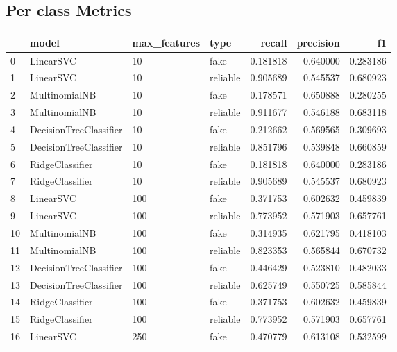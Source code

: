 \subsection{Per class Metrics}
\begin{longtable}{llllrrr}
\toprule
{} &                   model & max\_features &      type &    recall &  precision &        f1 \\
\midrule
0  &               LinearSVC &           10 &      fake &  0.181818 &   0.640000 &  0.283186 \\
1  &               LinearSVC &           10 &  reliable &  0.905689 &   0.545537 &  0.680923 \\
2  &           MultinomialNB &           10 &      fake &  0.178571 &   0.650888 &  0.280255 \\
3  &           MultinomialNB &           10 &  reliable &  0.911677 &   0.546188 &  0.683118 \\
4  &  DecisionTreeClassifier &           10 &      fake &  0.212662 &   0.569565 &  0.309693 \\
5  &  DecisionTreeClassifier &           10 &  reliable &  0.851796 &   0.539848 &  0.660859 \\
6  &         RidgeClassifier &           10 &      fake &  0.181818 &   0.640000 &  0.283186 \\
7  &         RidgeClassifier &           10 &  reliable &  0.905689 &   0.545537 &  0.680923 \\
8  &               LinearSVC &          100 &      fake &  0.371753 &   0.602632 &  0.459839 \\
9  &               LinearSVC &          100 &  reliable &  0.773952 &   0.571903 &  0.657761 \\
10 &           MultinomialNB &          100 &      fake &  0.314935 &   0.621795 &  0.418103 \\
11 &           MultinomialNB &          100 &  reliable &  0.823353 &   0.565844 &  0.670732 \\
12 &  DecisionTreeClassifier &          100 &      fake &  0.446429 &   0.523810 &  0.482033 \\
13 &  DecisionTreeClassifier &          100 &  reliable &  0.625749 &   0.550725 &  0.585844 \\
14 &         RidgeClassifier &          100 &      fake &  0.371753 &   0.602632 &  0.459839 \\
15 &         RidgeClassifier &          100 &  reliable &  0.773952 &   0.571903 &  0.657761 \\
16 &               LinearSVC &          250 &      fake &  0.470779 &   0.613108 &  0.532599 \\

\end{longtable}
